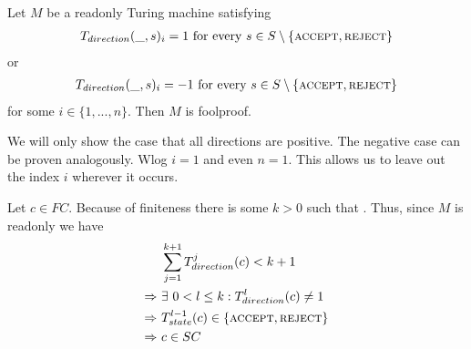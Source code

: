 \begin{Lemma} \label{turing_machines:lemma_foolproofness:lemma}
	Let $M$ be a readonly Turing machine satisfying
	\begin{align*}
		T_{direction} (\_,s)_i = 1~\text{for every}~ s \in S \setminus \{\text{\scshape{accept}},\text{\scshape{reject}}\}
	\end{align*}
	or
	\begin{align*}
		T_{direction} (\_,s)_i = -1~\text{for every}~ s \in S \setminus \{\text{\scshape{accept}},\text{\scshape{reject}}\}
	\end{align*}
	for some $i \in \{1,...,n\}$.
	Then $M$ is foolproof.
\end{Lemma}
\proof
We will only show the case that all directions are positive. The negative case can be proven analogously.
Wlog $i=1$ and even $n=1$. This allows us to leave out the index $i$ wherever it occurs.

Let $c \in FC$. Because of finiteness there is some $k > 0$ such that .
Thus, since $M$ is readonly we have
\begin{align*}
	&\sum_{j=1}^{k+1} T_{direction}^j (c) < k+1 \\
	\Rightarrow~&\exists~0 < l \leq k: T_{direction}^l (c) \neq 1 \\
	\Rightarrow~&T_{state}^{l-1} (c) \in \{\text{\scshape{accept}},\text{\scshape{reject}}\} \\
	\Rightarrow~&c \in SC
\end{align*}
\endproof
